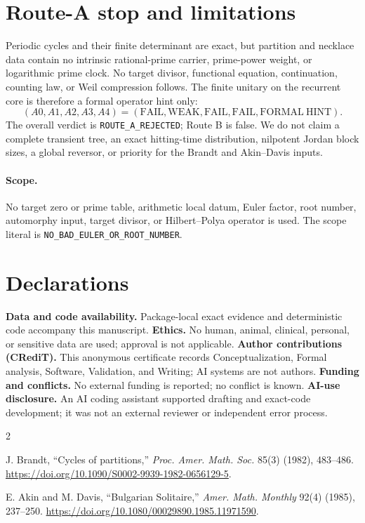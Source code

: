 \documentclass[9pt]{extarticle}
\begin{document}
\section{Route-A stop and limitations}
Periodic cycles and their finite determinant are exact, but partition and
necklace data contain no intrinsic rational-prime carrier, prime-power weight,
or logarithmic prime clock.  No target divisor, functional equation,
continuation, counting law, or Weil compression follows.  The finite unitary
on the recurrent core is therefore a formal operator hint only:
\[
 (A0,A1,A2,A3,A4)=(\mathrm{FAIL},\mathrm{WEAK},\mathrm{FAIL},
 \mathrm{FAIL},\mathrm{FORMAL\ HINT}).
\]
The overall verdict is \texttt{ROUTE\_A\_REJECTED}; Route B is false.  We do
not claim a complete transient tree, an exact hitting-time distribution,
nilpotent Jordan block sizes, a global reversor, or priority for the Brandt
and Akin--Davis inputs.

\paragraph{Scope.}
No target zero or prime table, arithmetic local datum, Euler factor, root
number, automorphy input, target divisor, or Hilbert--Polya operator is used.
The scope literal is \texttt{NO\_BAD\_EULER\_OR\_ROOT\_NUMBER}.

\section*{Declarations}
\small\noindent
\textbf{Data and code availability.} Package-local exact evidence and
deterministic code accompany this manuscript.
\textbf{Ethics.} No human, animal, clinical, personal, or sensitive data are
used; approval is not applicable.
\textbf{Author contributions (CRediT).} This anonymous certificate records
Conceptualization, Formal analysis, Software, Validation, and Writing; AI
systems are not authors.
\textbf{Funding and conflicts.} No external funding is reported; no conflict
is known.
\textbf{AI-use disclosure.} An AI coding assistant supported drafting and
exact-code development; it was not an external reviewer or independent error
process.\normalsize

\begin{thebibliography}{2}
\footnotesize
\raggedright
{} J. Brandt,
``Cycles of partitions,'' \emph{Proc. Amer. Math. Soc.} 85(3) (1982),
483--486. \url{https://doi.org/10.1090/S0002-9939-1982-0656129-5}.

 E. Akin and M. Davis,
``Bulgarian Solitaire,'' \emph{Amer. Math. Monthly} 92(4) (1985), 237--250.
\url{https://doi.org/10.1080/00029890.1985.11971590}.
\end{thebibliography}
\end{document}
